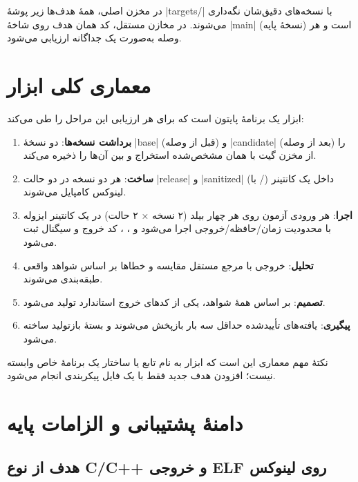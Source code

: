 \documentclass[12pt]{exam}
\begin{document}
در مخزن اصلی، همهٔ هدف‌ها زیر پوشهٔ \codeword|targets/| با نسخه‌های دقیق‌شان نگه‌داری
می‌شوند. در مخازن مستقل، کد همان هدف روی شاخهٔ \codeword|main| (نسخهٔ پایه) است و هر
وصله به‌صورت یک  جداگانه ارزیابی می‌شود.

\section{معماری کلی ابزار}

ابزار یک برنامهٔ پایتون است که برای هر ارزیابی این مراحل را طی می‌کند:

\begin{enumerate}
\item \textbf{برداشت نسخه‌ها}: دو نسخهٔ \codeword|base| (قبل از وصله) و
\codeword|candidate| (بعد از وصله) را از مخزن گیت با همان  مشخص‌شده استخراج
و  بین آن‌ها را ذخیره می‌کند.
\item \textbf{ساخت}: هر دو نسخه در دو حالت \codeword|release| و \codeword|sanitized|
(با /) داخل یک کانتینر لینوکس  کامپایل
می‌شوند.
\item \textbf{اجرا}: هر ورودی آزمون روی هر چهار بیلد (۲ نسخه × ۲ حالت) در یک کانتینر
ایزوله با محدودیت زمان/حافظه/خروجی اجرا می‌شود و ، ، کد خروج و
سیگنال ثبت می‌شود.
\item \textbf{تحلیل}: خروجی با مرجع مستقل مقایسه و خطاها بر اساس شواهد واقعی طبقه‌بندی
می‌شوند.
\item \textbf{تصمیم}: بر اساس همهٔ شواهد، یکی از کدهای خروج استاندارد تولید می‌شود.
\item \textbf{پیگیری}: یافته‌های تأییدشده حداقل سه بار بازپخش می‌شوند و بستهٔ بازتولید
ساخته می‌شود.
\end{enumerate}

نکتهٔ مهم معماری این است که ابزار به نام تابع یا ساختار یک برنامهٔ خاص وابسته نیست؛
افزودن هدف جدید فقط با یک فایل پیکربندی  انجام می‌شود.

\section{دامنهٔ پشتیبانی و الزامات پایه}

\subsection{هدف از نوع C/C++ و خروجی ELF روی لینوکس}
\end{document}
